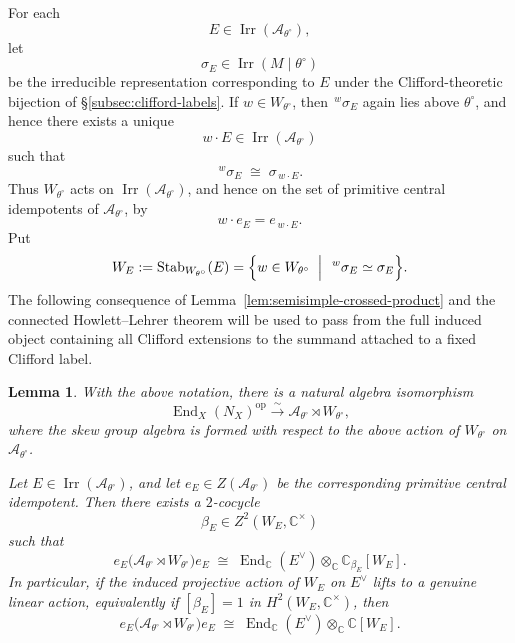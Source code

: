\documentclass{amsart}
\theoremstyle{plain}
\numberwithin{equation}{section}
\newtheorem{lemma}[theorem]{Lemma}
\theoremstyle{definition}
\newcommand{\op}{\operatorname{op}}
\newcommand{\End}{\operatorname{End}}
\newcommand{\Irr}{\operatorname{Irr}}
\newcommand{\cA}{\mathcal{A}}
\newcommand{\C}{\mathbb{C}}
\begin{document}
For each
\[
E\in \Irr(\cA_{\theta^\circ}),
\]
let
\[
\sigma_E\in \Irr(M\mid \theta^\circ)
\]
be the irreducible representation corresponding to \(E\) under the
Clifford-theoretic bijection of \S\ref{subsec:clifford-labels}.  If
\(w\in W_{\theta^\circ}\), then \({}^{\,w}\sigma_E\) again lies above
\(\theta^\circ\), and hence there exists a unique
\[
w\cdot E\in \Irr(\cA_{\theta^\circ})
\]
such that
\[
{}^{\,w}\sigma_E \;\cong\; \sigma_{\,w\cdot E}.
\]
Thus \(W_{\theta^\circ}\) acts on \(\Irr(\cA_{\theta^\circ})\), and hence on the
set of primitive central idempotents of \(\cA_{\theta^\circ}\), by
\[
w\cdot e_E = e_{\,w\cdot E}.
\]
Put
\[
W_E:=\operatorname{Stab}_{W_{\theta^\circ}}(E)
=
\Bigl\{
w\in W_{\theta^\circ}\;\Bigm|\;{}^{\,w}\sigma_E\simeq \sigma_E
\Bigr\}.
\]
\smallskip
The following consequence of Lemma~\ref{lem:semisimple-crossed-product}
and the connected Howlett--Lehrer theorem will be used to pass from the
full induced object containing all Clifford extensions to the summand
attached to a fixed Clifford label.
\begin{lemma}\label{lem:corner-lemma}
With the above notation, there is a natural algebra isomorphism
\[
\End_X(N_X)^{\op}\xrightarrow{\sim}
\cA_{\theta^\circ}\rtimes W_{\theta^\circ},
\]
where the skew group algebra is formed with respect to the above action of
\(W_{\theta^\circ}\) on \(\cA_{\theta^\circ}\).

Let \(E\in \Irr(\cA_{\theta^\circ})\), and let
\(e_E\in Z(\cA_{\theta^\circ})\) be the corresponding primitive central
idempotent.  Then there exists a \(2\)-cocycle
\[
\beta_E\in Z^2(W_E,\C^\times)
\]
such that
\[
e_E\bigl(\cA_{\theta^\circ}\rtimes W_{\theta^\circ}\bigr)e_E
\;\cong\;
\End_\C(E^\vee)\otimes_\C \C_{\beta_E}[W_E].
\]
In particular, if the induced projective action of \(W_E\) on \(E^\vee\) lifts to
a genuine linear action, equivalently if \([\beta_E]=1\) in
\(H^2(W_E,\C^\times)\), then
\[
e_E\bigl(\cA_{\theta^\circ}\rtimes W_{\theta^\circ}\bigr)e_E
\;\cong\;
\End_\C(E^\vee)\otimes_\C \C[W_E].
\]
\end{lemma}
\end{document}
